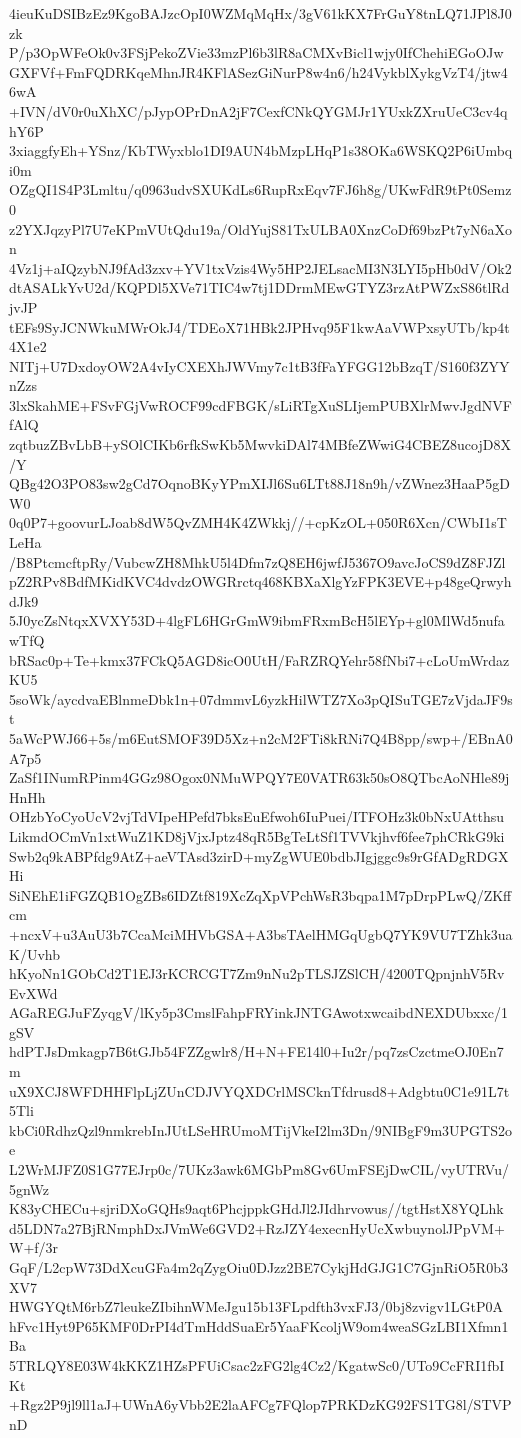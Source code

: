 4ieuKuDSIBzEz9KgoBAJzcOpI0WZMqMqHx/3gV61kKX7FrGuY8tnLQ71JPl8J0zk
P/p3OpWFeOk0v3FSjPekoZVie33mzPl6b3lR8aCMXvBicl1wjy0IfChehiEGoOJw
GXFVf+FmFQDRKqeMhnJR4KFlASezGiNurP8w4n6/h24VykblXykgVzT4/jtw46wA
+IVN/dV0r0uXhXC/pJypOPrDnA2jF7CexfCNkQYGMJr1YUxkZXruUeC3cv4qhY6P
3xiaggfyEh+YSnz/KbTWyxblo1DI9AUN4bMzpLHqP1s38OKa6WSKQ2P6iUmbqi0m
OZgQI1S4P3Lmltu/q0963udvSXUKdLs6RupRxEqv7FJ6h8g/UKwFdR9tPt0Semz0
z2YXJqzyPl7U7eKPmVUtQdu19a/OldYujS81TxULBA0XnzCoDf69bzPt7yN6aXon
4Vz1j+aIQzybNJ9fAd3zxv+YV1txVzis4Wy5HP2JELsacMI3N3LYI5pHb0dV/Ok2
dtASALkYvU2d/KQPDl5XVe71TIC4w7tj1DDrmMEwGTYZ3rzAtPWZxS86tlRdjvJP
tEFs9SyJCNWkuMWrOkJ4/TDEoX71HBk2JPHvq95F1kwAaVWPxsyUTb/kp4t4X1e2
NITj+U7DxdoyOW2A4vIyCXEXhJWVmy7c1tB3fFaYFGG12bBzqT/S160f3ZYYnZzs
3lxSkahME+FSvFGjVwROCF99cdFBGK/sLiRTgXuSLIjemPUBXlrMwvJgdNVFfAlQ
zqtbuzZBvLbB+ySOlCIKb6rfkSwKb5MwvkiDAl74MBfeZWwiG4CBEZ8ucojD8X/Y
QBg42O3PO83sw2gCd7OqnoBKyYPmXIJl6Su6LTt88J18n9h/vZWnez3HaaP5gDW0
0q0P7+goovurLJoab8dW5QvZMH4K4ZWkkj//+cpKzOL+050R6Xcn/CWbI1sTLeHa
/B8PtcmcftpRy/VubcwZH8MhkU5l4Dfm7zQ8EH6jwfJ5367O9avcJoCS9dZ8FJZl
pZ2RPv8BdfMKidKVC4dvdzOWGRrctq468KBXaXlgYzFPK3EVE+p48geQrwyhdJk9
5J0ycZsNtqxXVXY53D+4lgFL6HGrGmW9ibmFRxmBcH5lEYp+gl0MlWd5nufawTfQ
bRSac0p+Te+kmx37FCkQ5AGD8icO0UtH/FaRZRQYehr58fNbi7+cLoUmWrdazKU5
5soWk/aycdvaEBlnmeDbk1n+07dmmvL6yzkHilWTZ7Xo3pQISuTGE7zVjdaJF9st
5aWcPWJ66+5s/m6EutSMOF39D5Xz+n2cM2FTi8kRNi7Q4B8pp/swp+/EBnA0A7p5
ZaSf1INumRPinm4GGz98Ogox0NMuWPQY7E0VATR63k50sO8QTbcAoNHle89jHnHh
OHzbYoCyoUcV2vjTdVIpeHPefd7bksEuEfwoh6IuPuei/ITFOHz3k0bNxUAtthsu
LikmdOCmVn1xtWuZ1KD8jVjxJptz48qR5BgTeLtSf1TVVkjhvf6fee7phCRkG9ki
Swb2q9kABPfdg9AtZ+aeVTAsd3zirD+myZgWUE0bdbJIgjggc9s9rGfADgRDGXHi
SiNEhE1iFGZQB1OgZBs6IDZtf819XcZqXpVPchWsR3bqpa1M7pDrpPLwQ/ZKffcm
+ncxV+u3AuU3b7CcaMciMHVbGSA+A3bsTAelHMGqUgbQ7YK9VU7TZhk3uaK/Uvhb
hKyoNn1GObCd2T1EJ3rKCRCGT7Zm9nNu2pTLSJZSlCH/4200TQpnjnhV5RvEvXWd
AGaREGJuFZyqgV/lKy5p3CmslFahpFRYinkJNTGAwotxwcaibdNEXDUbxxc/1gSV
hdPTJsDmkagp7B6tGJb54FZZgwlr8/H+N+FE14l0+Iu2r/pq7zsCzctmeOJ0En7m
uX9XCJ8WFDHHFlpLjZUnCDJVYQXDCrlMSCknTfdrusd8+Adgbtu0C1e91L7t5Tli
kbCi0RdhzQzl9nmkrebInJUtLSeHRUmoMTijVkeI2lm3Dn/9NIBgF9m3UPGTS2oe
L2WrMJFZ0S1G77EJrp0c/7UKz3awk6MGbPm8Gv6UmFSEjDwCIL/vyUTRVu/5gnWz
K83yCHECu+sjriDXoGQHs9aqt6PhcjppkGHdJl2JIdhrvowus//tgtHstX8YQLhk
d5LDN7a27BjRNmphDxJVmWe6GVD2+RzJZY4execnHyUcXwbuynolJPpVM+W+f/3r
GqF/L2cpW73DdXcuGFa4m2qZygOiu0DJzz2BE7CykjHdGJG1C7GjnRiO5R0b3XV7
HWGYQtM6rbZ7leukeZIbihnWMeJgu15b13FLpdfth3vxFJ3/0bj8zvigv1LGtP0A
hFvc1Hyt9P65KMF0DrPI4dTmHddSuaEr5YaaFKcoljW9om4weaSGzLBI1Xfmn1Ba
5TRLQY8E03W4kKKZ1HZsPFUiCsac2zFG2lg4Cz2/KgatwSc0/UTo9CcFRI1fbIKt
+Rgz2P9jl9ll1aJ+UWnA6yVbb2E2laAFCg7FQlop7PRKDzKG92FS1TG8l/STVPnD
